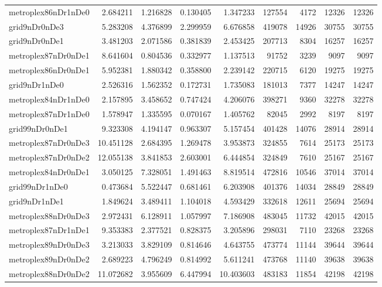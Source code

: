 \begin{longtable}{|l|r|r|r|r|r|r|r|r|}
metroplex86nDr1nDe0 & 2.684211 & 1.216828 & 0.130405 & 1.347233 & 127554 & 4172 & 12326 & 12326 \\
grid9nDr0nDe3 & 5.283208 & 4.376899 & 2.299959 & 6.676858 & 419078 & 14926 & 30755 & 30755 \\
grid9nDr0nDe1 & 3.481203 & 2.071586 & 0.381839 & 2.453425 & 207713 & 8304 & 16257 & 16257 \\
metroplex87nDr0nDe1 & 8.641604 & 0.804536 & 0.332977 & 1.137513 & 91752 & 3239 & 9097 & 9097 \\
metroplex86nDr0nDe1 & 5.952381 & 1.880342 & 0.358800 & 2.239142 & 220715 & 6120 & 19275 & 19275 \\
grid9nDr1nDe0 & 2.526316 & 1.562352 & 0.172731 & 1.735083 & 181013 & 7377 & 14247 & 14247 \\
metroplex84nDr1nDe0 & 2.157895 & 3.458652 & 0.747424 & 4.206076 & 398271 & 9360 & 32278 & 32278 \\
metroplex87nDr1nDe0 & 1.578947 & 1.335595 & 0.070167 & 1.405762 & 82045 & 2992 & 8197 & 8197 \\
grid99nDr0nDe1 & 9.323308 & 4.194147 & 0.963307 & 5.157454 & 401428 & 14076 & 28914 & 28914 \\
metroplex87nDr0nDe3 & 10.451128 & 2.684395 & 1.269478 & 3.953873 & 324855 & 7614 & 25173 & 25173 \\
metroplex87nDr0nDe2 & 12.055138 & 3.841853 & 2.603001 & 6.444854 & 324849 & 7610 & 25167 & 25167 \\
metroplex84nDr0nDe1 & 3.050125 & 7.328051 & 1.491463 & 8.819514 & 472816 & 10546 & 37014 & 37014 \\
grid99nDr1nDe0 & 0.473684 & 5.522447 & 0.681461 & 6.203908 & 401376 & 14034 & 28849 & 28849 \\
grid9nDr1nDe1 & 1.849624 & 3.489411 & 1.104018 & 4.593429 & 332618 & 12611 & 25694 & 25694 \\
metroplex88nDr0nDe3 & 2.972431 & 6.128911 & 1.057997 & 7.186908 & 483045 & 11732 & 42015 & 42015 \\
metroplex87nDr1nDe1 & 9.353383 & 2.377521 & 0.828375 & 3.205896 & 298031 & 7110 & 23268 & 23268 \\
metroplex89nDr0nDe3 & 3.213033 & 3.829109 & 0.814646 & 4.643755 & 473774 & 11144 & 39644 & 39644 \\
metroplex89nDr0nDe2 & 2.689223 & 4.796249 & 0.814992 & 5.611241 & 473768 & 11140 & 39638 & 39638 \\
metroplex88nDr0nDe2 & 11.072682 & 3.955609 & 6.447994 & 10.403603 & 483183 & 11854 & 42198 & 42198 \\

\end{longtable}
